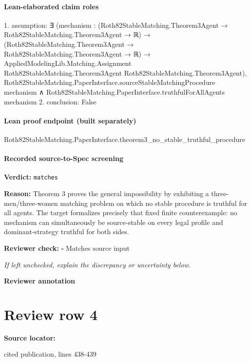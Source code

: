 \documentclass[10pt]{article}
\newcommand{\reviewerbox}{%
  \par\noindent\fbox{\parbox{0.96\linewidth}{\rule{0pt}{0.38in}}}\par
}
\newcommand{\reviewmatch}[1]{%
  \par\noindent\textbf{Reviewer check:} $\square$\; #1\par
  \noindent\emph{If left unchecked, explain the discrepancy or uncertainty below.}\par
}
\begin{document}
\paragraph{Lean-elaborated claim roles}\begin{ReviewVerbatim}
1. assumption: ∃ (mechanism :
  (Roth82StableMatching.Theorem3Agent → Roth82StableMatching.Theorem3Agent → ℝ) →
    (Roth82StableMatching.Theorem3Agent → Roth82StableMatching.Theorem3Agent → ℝ) →
      AppliedModelingLib.Matching.Assignment Roth82StableMatching.Theorem3Agent Roth82StableMatching.Theorem3Agent),
  Roth82StableMatching.PaperInterface.sourceStableMatchingProcedure mechanism ∧
    Roth82StableMatching.PaperInterface.truthfulForAllAgents mechanism
2. conclusion: False
\end{ReviewVerbatim}

\paragraph{Lean proof endpoint (built separately)}\begin{ReviewVerbatim}
Roth82StableMatching.PaperInterface.theorem3_no_stable_truthful_procedure
\end{ReviewVerbatim}

\paragraph{Recorded source-to-Spec screening}
\textbf{Verdict:} \texttt{matches}
\\
{\raggedright
\textbf{Reason:} Theorem 3 proves the general impossibility by exhibiting a three-\allowbreak{}men/\allowbreak{}three-\allowbreak{}women matching problem on which no stable procedure is truthful for all agents.\allowbreak{}  The target formalizes precisely that fixed finite counterexample:\allowbreak{} no mechanism can simultaneously be source-\allowbreak{}stable on every legal profile and dominant-\allowbreak{}strategy truthful for both sides.\allowbreak{}
\par}
\reviewmatch{Matches source input}
\noindent\textbf{Reviewer annotation}\par
\reviewerbox
\clearpage
\hypertarget{source-claim-3a4281641c18a9e6}{}
\section*{Review row 4}
\textbf{Source locator:} {\footnotesize\raggedright cited publication, lines 438-\allowbreak{}439\par}
\end{document}
